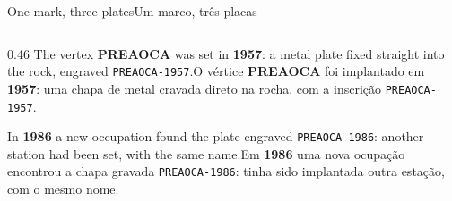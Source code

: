 \documentclass[aspectratio=169,11pt]{beamer}
\newcommand{\tr}[2]{\ifEN#2\else#1\fi}
\begin{document}
\begin{frame}{\tr{Um marco, três placas}{One mark, three plates}}
  \begin{columns}[T]
    \begin{column}{0.46\textwidth}
      \small
      \tr{O vértice \textbf{PREAOCA} foi implantado em \textbf{1957}: uma chapa de metal
      cravada direto na rocha, com a inscrição \texttt{PREAOCA-1957}.}{The vertex
      \textbf{PREAOCA} was set in \textbf{1957}: a metal plate fixed straight into the rock,
      engraved \texttt{PREAOCA-1957}.}
      \medskip

      \tr{Em \textbf{1986} uma nova ocupação encontrou a chapa gravada
      \texttt{PREAOCA-1986}: tinha sido implantada \alert{outra estação}, com o mesmo
      nome.}{In \textbf{1986} a new occupation found the plate engraved
      \texttt{PREAOCA-1986}: \alert{another station} had been set, with the same name.}
      \medskip


\end{column}
\end{columns}
\end{frame}
\end{document}
